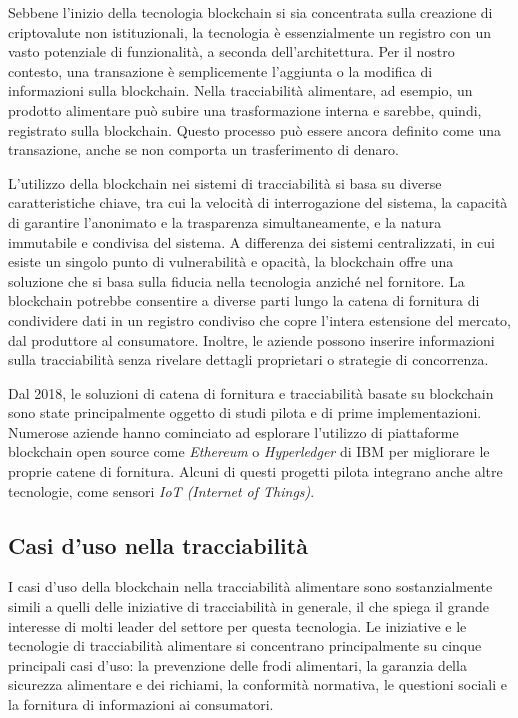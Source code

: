 Sebbene l'inizio della tecnologia blockchain si sia concentrata sulla creazione di criptovalute non istituzionali, la tecnologia è essenzialmente un registro con un vasto potenziale di funzionalità, a seconda dell'architettura. Per il nostro contesto, una transazione è semplicemente l'aggiunta o la modifica di informazioni sulla blockchain. Nella tracciabilità alimentare, ad esempio, un prodotto alimentare può subire una trasformazione interna e sarebbe, quindi, registrato sulla blockchain. Questo processo può essere ancora definito come una transazione, anche se non comporta un trasferimento di denaro.

L'utilizzo della blockchain nei sistemi di tracciabilità si basa su diverse caratteristiche chiave, tra cui la velocità di interrogazione del sistema, la capacità di garantire l'anonimato e la trasparenza simultaneamente, e la natura immutabile e condivisa del sistema. A differenza dei sistemi centralizzati, in cui esiste un singolo punto di vulnerabilità e opacità, la blockchain offre una soluzione che si basa sulla fiducia nella tecnologia anziché nel fornitore. La blockchain potrebbe consentire a diverse parti lungo la catena di fornitura di condividere dati in un registro condiviso che copre l'intera estensione del mercato, dal produttore al consumatore. Inoltre, le aziende possono inserire informazioni sulla tracciabilità senza rivelare dettagli proprietari o strategie di concorrenza.

Dal 2018, le soluzioni di catena di fornitura e tracciabilità basate su blockchain sono state principalmente oggetto di studi pilota e di prime implementazioni. Numerose aziende hanno cominciato ad esplorare l'utilizzo di piattaforme blockchain open source come \textit{Ethereum} o \textit{Hyperledger} di IBM per migliorare le proprie catene di fornitura. Alcuni di questi progetti pilota integrano anche altre tecnologie, come sensori \textit{IoT (Internet of Things)}.

\subsection{Casi d'uso nella tracciabilità}

I casi d'uso della blockchain nella tracciabilità alimentare sono sostanzialmente simili a quelli delle iniziative di tracciabilità in generale, il che spiega il grande interesse di molti leader del settore per questa tecnologia. Le iniziative e le tecnologie di tracciabilità alimentare si concentrano principalmente su cinque principali casi d'uso: la prevenzione delle frodi alimentari, la garanzia della sicurezza alimentare e dei richiami, la conformità normativa, le questioni sociali e la fornitura di informazioni ai consumatori.

